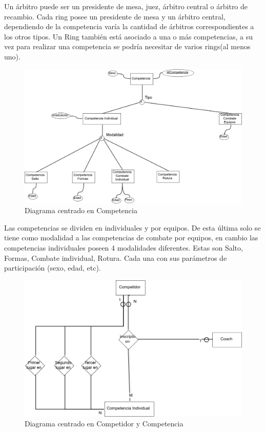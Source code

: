 Un árbitro puede ser un presidente de mesa, juez, árbitro central o árbitro de recambio. Cada ring posee un presidente de mesa
y un árbitro central, dependiendo de la competencia varía la cantidad de árbitros correspondientes a los otros tipos.
Un Ring también está asociado a una o más competencias, a su vez para realizar una competencia se podría necesitar de  varios
rings(al menos uno).

\begin{figure}[H]
  \centering
    \includegraphics[scale=0.3]{imagenes/Competencia.png}
  \caption{Diagrama centrado en Competencia}
\end{figure}

Las competencias se dividen en individuales y por equipos. De esta última solo se tiene
 como modalidad a las competencias de combate por equipos, en cambio las competencias individuales poseen 4
 modalidades diferentes. Estas son Salto, Formas, Combate individual, Rotura. Cada una con sus parámetros de participación
 (sexo, edad, etc).

\begin{figure}[H]
  \centering
    \includegraphics[scale=0.5]{imagenes/CompetidorCompetencia.png}
  \caption{Diagrama centrado en Competidor y Competencia}
\end{figure}

